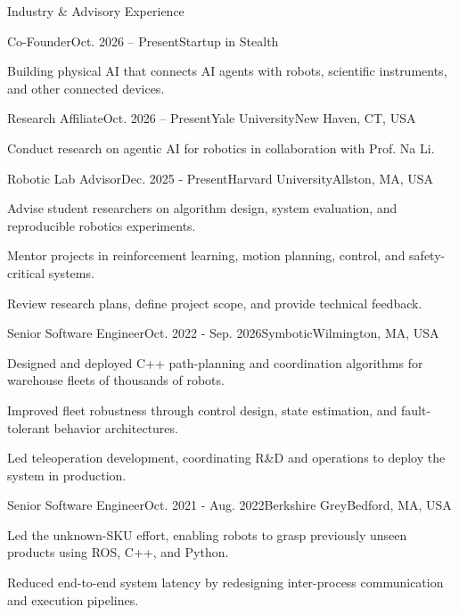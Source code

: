 \documentclass{resume} %
\begin{document}
\begin{rSection}{Industry \& Advisory Experience}

\begin{rSubsection}{Co-Founder}{Oct. 2026 -- Present}{Startup in Stealth}{}
\item Building physical AI that connects AI agents with robots, scientific instruments, and other connected devices.
\end{rSubsection}

\begin{rSubsection}{Research Affiliate}{Oct. 2026 -- Present}{Yale University}{New Haven, CT, USA}
\item Conduct research on agentic AI for robotics in collaboration with Prof. Na Li.
\end{rSubsection}

\begin{rSubsection}{Robotic Lab Advisor}{Dec. 2025 - Present}{Harvard University}{Allston, MA, USA}
\item Advise student researchers on algorithm design, system evaluation, and reproducible robotics experiments.
\item Mentor projects in reinforcement learning, motion planning, control, and safety-critical systems.
\item Review research plans, define project scope, and provide technical feedback.
\end{rSubsection}

\begin{rSubsection}{Senior Software Engineer}{Oct. 2022 - Sep. 2026}{Symbotic}{Wilmington, MA, USA}
\item Designed and deployed C++ path-planning and coordination algorithms for warehouse fleets of thousands of robots.
\item Improved fleet robustness through control design, state estimation, and fault-tolerant behavior architectures.
\item Led teleoperation development, coordinating R\&D and operations to deploy the system in production.
\end{rSubsection}

\begin{rSubsection}{Senior Software Engineer}{Oct. 2021 - Aug. 2022}{Berkshire Grey}{Bedford, MA, USA}
\item Led the unknown-SKU effort, enabling robots to grasp previously unseen products using ROS, C++, and Python.
\item Reduced end-to-end system latency by redesigning inter-process communication and execution pipelines.
\end{rSubsection}


\end{rSection}
\end{document}
